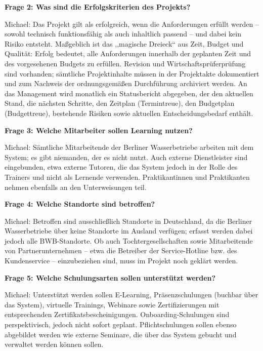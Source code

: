 \documentclass[
    12pt, 
    a4paper,
    ]{scrartcl} %
\begin{document}
\medskip
\textbf{Frage 2: Was sind die Erfolgskriterien des Projekts?}

Michael: Das Projekt gilt als erfolgreich, wenn die Anforderungen erf\"ullt werden -- sowohl technisch funktionsf\"ahig als auch inhaltlich passend -- und dabei kein Risiko entsteht. Ma{\ss}geblich ist das ,,magische Dreieck`` aus Zeit, Budget und Qualit\"at: Erfolg bedeutet, alle Anforderungen innerhalb der geplanten Zeit und des vorgesehenen Budgets zu erf\"ullen. Revision und Wirtschaftspr\"uferpr\"ufung sind vorhanden; s\"amtliche Projektinhalte m\"ussen in der Projektakte dokumentiert und zum Nachweis der ordnungsgem\"a{\ss}en Durchf\"uhrung archiviert werden. An das Management wird monatlich ein Statusbericht abgegeben, der den aktuellen Stand, die n\"achsten Schritte, den Zeitplan (Termintreue), den Budgetplan (Budgettreue), bestehende Risiken sowie aktuellen Entscheidungsbedarf enth\"alt.

\bigskip
{}

\textbf{Frage 3: Welche Mitarbeiter sollen Learning nutzen?}

Michael: S\"amtliche Mitarbeitende der Berliner Wasserbetriebe arbeiten mit dem System; es gibt niemanden, der es nicht nutzt. Auch externe Dienstleister sind eingebunden, etwa externe Tutoren, die das System jedoch in der Rolle des Trainers und nicht als Lernende verwenden. Praktikantinnen und Praktikanten nehmen ebenfalls an den Unterweisungen teil.

\medskip
\textbf{Frage 4: Welche Standorte sind betroffen?}

Michael: Betroffen sind ausschlie{\ss}lich Standorte in Deutschland, da die Berliner Wasserbetriebe \"uber keine Standorte im Ausland verf\"ugen; erfasst werden dabei jedoch alle BWB-Standorte. Ob auch Tochtergesellschaften sowie Mitarbeitende von Partnerunternehmen -- etwa die Betreiber der Service-Hotline bzw. des Kundenservice -- einzubeziehen sind, muss im Projekt noch gekl\"art werden.

\medskip
\textbf{Frage 5: Welche Schulungsarten sollen unterst\"utzt werden?}

Michael: Unterst\"utzt werden sollen E-Learning, Pr\"asenzschulungen (buchbar \"uber das System), virtuelle Trainings, Webinare sowie Zertifizierungen mit entsprechenden Zertifikatsbescheinigungen. Onboarding-Schulungen sind perspektivisch, jedoch nicht sofort geplant. Pflichtschulungen sollen ebenso abgebildet werden wie externe Seminare, die \"uber das System gebucht und verwaltet werden k\"onnen sollen.
\end{document}
